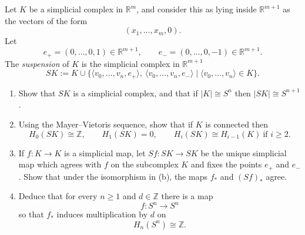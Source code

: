 \begin{problem}
Let \(K\) be a simplicial complex in \(\mathbb R^m\), and consider this as lying inside \(\mathbb R^{m+1}\) as the vectors of the form
\[
(x_1,\dots,x_m,0).
\]
Let
\[
e_+=(0,\dots,0,1)\in \mathbb R^{m+1},
\qquad
e_-=(0,\dots,0,-1)\in \mathbb R^{m+1}.
\]
The \emph{suspension} of \(K\) is the simplicial complex in \(\mathbb R^{m+1}\)
\[
SK:=K\cup \{\langle v_0,\dots,v_n,e_+\rangle,\ \langle v_0,\dots,v_n,e_-\rangle
\mid \langle v_0,\dots,v_n\rangle\in K\}.
\]

\begin{enumerate}
	\item[(a)] Show that \(SK\) is a simplicial complex, and that if \(|K|\cong S^n\) then \(|SK|\cong S^{n+1}\).
	\item[(b)] Using the Mayer--Vietoris sequence, show that if \(K\) is connected then
	\[
	H_0(SK)\cong \mathbb Z,\qquad H_1(SK)=0,
	\qquad H_i(SK)\cong H_{i-1}(K)\ \text{if } i\ge 2.
	\]
	\item[(c)] If \(f:K\to K\) is a simplicial map, let \(Sf:SK\to SK\) be the unique simplicial map which agrees with \(f\) on the subcomplex \(K\) and fixes the points \(e_+\) and \(e_-\). Show that under the isomorphism in (b), the maps \(f_*\) and \((Sf)_*\) agree.
	\item[(d)] Deduce that for every \(n\ge 1\) and \(d\in \mathbb Z\) there is a map
	\[
	f:S^n\to S^n
	\]
	so that \(f_*\) induces multiplication by \(d\) on
	\[
	H_n(S^n)\cong \mathbb Z.
	\]
\end{enumerate}
\end{problem}

